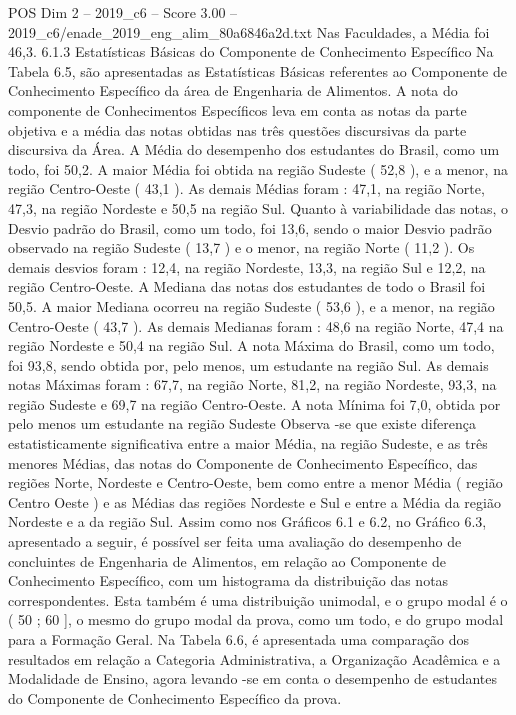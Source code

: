 \begin{textsample}{POS Dim 2 – 2019\_c6 – Score 3.00 – 2019\_c6/enade\_2019\_eng\_alim\_80a6846a2d.txt}
Nas Faculdades, a Média foi 46,3. 6.1.3 Estatísticas Básicas do Componente de Conhecimento Específico Na Tabela 6.5, são apresentadas as Estatísticas Básicas referentes ao Componente de Conhecimento Específico da área de Engenharia de Alimentos.
A nota do componente de Conhecimentos Específicos leva em conta as notas da parte objetiva e a média das notas obtidas nas três questões discursivas da parte discursiva da Área.
A Média do desempenho dos estudantes do Brasil, como um todo, foi 50,2.
A maior Média foi obtida na região Sudeste ( 52,8 ), e a menor, na região Centro-Oeste ( 43,1 ).
As demais Médias foram : 47,1, na região Norte, 47,3, na região Nordeste e 50,5 na região Sul.
Quanto à variabilidade das notas, o Desvio padrão do Brasil, como um todo, foi 13,6, sendo o maior Desvio padrão observado na região Sudeste ( 13,7 ) e o menor, na região Norte ( 11,2 ).
Os demais desvios foram : 12,4, na região Nordeste, 13,3, na região Sul e 12,2, na região Centro-Oeste.
A Mediana das notas dos estudantes de todo o Brasil foi 50,5.
A maior Mediana ocorreu na região Sudeste ( 53,6 ), e a menor, na região Centro-Oeste ( 43,7 ).
As demais Medianas foram : 48,6 na região Norte, 47,4 na região Nordeste e 50,4 na região Sul.
A nota Máxima do Brasil, como um todo, foi 93,8, sendo obtida por, pelo menos, um estudante na região Sul.
As demais notas Máximas foram : 67,7, na região Norte, 81,2, na região Nordeste, 93,3, na região Sudeste e 69,7 na região Centro-Oeste.
A nota Mínima foi 7,0, obtida por pelo menos um estudante na região Sudeste Observa -se que existe diferença estatisticamente significativa entre a maior Média, na região Sudeste, e as três menores Médias, das notas do Componente de Conhecimento Específico, das regiões Norte, Nordeste e Centro-Oeste, bem como entre a menor Média ( região Centro Oeste ) e as Médias das regiões Nordeste e Sul e entre a Média da região Nordeste e a da região Sul.
Assim como nos Gráficos 6.1 e 6.2, no Gráfico 6.3, apresentado a seguir, é possível ser feita uma avaliação do desempenho de concluintes de Engenharia de Alimentos, em relação ao Componente de Conhecimento Específico, com um histograma da distribuição das notas correspondentes.
Esta também é uma distribuição unimodal, e o grupo modal é o ( 50 ; 60 ], o mesmo do grupo modal da prova, como um todo, e do grupo modal para a Formação Geral.
Na Tabela 6.6, é apresentada uma comparação dos resultados em relação a Categoria Administrativa, a Organização Acadêmica e a Modalidade de Ensino, agora levando -se em conta o desempenho de estudantes do Componente de Conhecimento Específico da prova.

\end{textsample}
